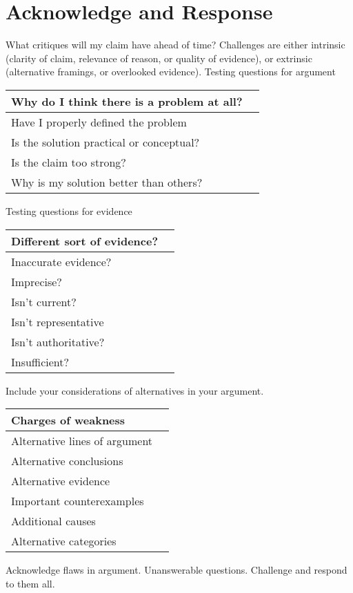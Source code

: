 \documentclass[10pt, a4paper]{article}
\begin{document}
	\section{Acknowledge and Response}
	What critiques will my claim have ahead of time? Challenges are either intrinsic (clarity of claim, relevance of reason, or quality of evidence), or extrinsic (alternative framings, or overlooked evidence). Testing questions for argument
	\begin{center}
		\begin{tabular}{|l |l|}
			\hline
			Why do I think there is a problem at all?&\\
			\hline
			Have I properly defined the problem &\\
			\hline
			Is the solution practical or conceptual?&\\
			\hline
			Is the claim too strong?&\\
			\hline
			Why is my solution better than others?&\\
			\hline
		\end{tabular}
	\end{center}
	Testing questions for evidence
	\begin{center}
		\begin{tabular}{|l |l|}
			\hline
			Different sort of evidence?&\\
			\hline
			Inaccurate evidence?&\\
			\hline
			Imprecise?&\\
			\hline
			Isn't current?&\\
			\hline
			Isn't representative&\\
			\hline
			Isn't authoritative?&\\
			\hline
			Insufficient?&\\
			\hline
		\end{tabular}
	\end{center}
	Include your considerations of alternatives in your argument.
	\begin{center}
		\begin{tabular}{|l |l|}
			\hline
			Charges of weakness&\\
			\hline
			Alternative lines of argument&\\
			\hline
			Alternative conclusions&\\
			\hline
			Alternative evidence&\\
			\hline
			Important counterexamples&\\
			\hline
			Additional causes&\\
			\hline
			Alternative categories&\\
			\hline
		\end{tabular}
	\end{center}
	Acknowledge flaws in argument. Unanswerable questions. Challenge and respond to them all.
\end{document}
